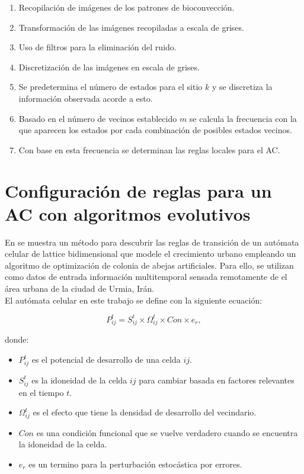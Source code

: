 \begin{enumerate}
	\item Recopilación de imágenes de los patrones de bioconvección.
	\item Transformación de las imágenes recopiladas a escala de grises.
	\item Uso de filtros para la eliminación del ruido.
	\item Discretización de las imágenes en escala de grises.
	\item Se predetermina el número de estados para el sitio $k$ y se discretiza la información observada acorde a esto.
	\item Basado en el número de vecinos establecido $m$ se calcula la frecuencia con la que aparecen los estados por cada combinación de posibles estados vecinos.
	\item Con base en esta frecuencia se determinan las reglas locales para el AC.
\end{enumerate}

\section{Configuración de reglas para un AC con algoritmos evolutivos}

En \cite{naghibi2016discovery} se muestra un método para descubrir las reglas de transición de un autómata celular de lattice bidimensional que modele el crecimiento urbano empleando un algoritmo de optimización de colonia de abejas artificiales. Para ello, se utilizan como datos de entrada información multitemporal sensada remotamente de el área urbana de la ciudad de Urmia, Irán.
\\
El autómata celular en este trabajo se define con la siguiente ecuación:

\begin{equation} \label{eq:8}
P^t_{ij} = S^t_{ij}\times\Omega^t_{ij}\times Con\times e_r,
\end{equation}

donde:
\begin{itemize}
	\item $P^t_{ij} $ es el potencial de desarrollo de una celda $ij$.
	\item $S^t_{ij}$ es la idoneidad de la celda $ij$ para cambiar basada en factores relevantes en el tiempo $t$.
	\item $\Omega^t_{ij}$ es el efecto que tiene la densidad de desarrollo del vecindario.
	\item $Con$ es una condición funcional que se vuelve verdadero cuando se encuentra la idoneidad de la celda.
	\item $e_r$ es un termino para la perturbación estocástica por errores.
\end{itemize}

